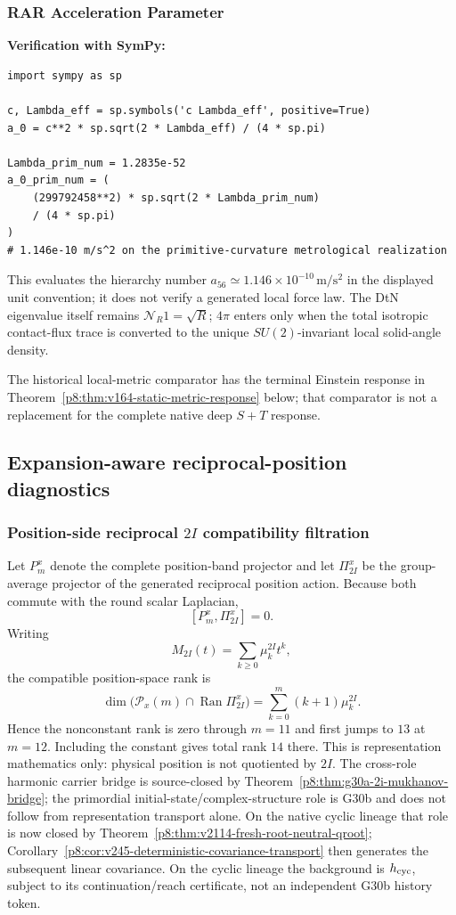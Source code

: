 \documentclass[12pt,a4paper]{article}
\begin{document}
\subsubsection{RAR Acceleration Parameter}
\textbf{Verification with SymPy:}
\begin{verbatim}
import sympy as sp

c, Lambda_eff = sp.symbols('c Lambda_eff', positive=True)
a_0 = c**2 * sp.sqrt(2 * Lambda_eff) / (4 * sp.pi)

Lambda_prim_num = 1.2835e-52
a_0_prim_num = (
    (299792458**2) * sp.sqrt(2 * Lambda_prim_num)
    / (4 * sp.pi)
)
# 1.146e-10 m/s^2 on the primitive-curvature metrological realization
\end{verbatim}
This evaluates the hierarchy number
$a_{56}\simeq1.146\times10^{-10}\,\mathrm{m/s^2}$ in the displayed unit
convention; it does not verify a generated local force law.
The DtN eigenvalue itself remains $\mathcal N_R1=\sqrt R$;
$4\pi$ enters only when the total isotropic contact-flux trace is converted to
the unique $SU(2)$-invariant local solid-angle density.

The historical local-metric comparator has the terminal Einstein response
in Theorem~\ref{p8:thm:v164-static-metric-response} below; that comparator
is not a replacement for the complete native deep $S+T$ response.

\subsection{Expansion-aware reciprocal-position diagnostics}
\label{p8:app:v191-expansion-reciprocal-diagnostics}

\subsubsection{Position-side reciprocal $2I$ compatibility filtration}
Let $P_m^x$ denote the complete position-band projector and let
$\Pi_{2I}^x$ be the group-average projector of the generated reciprocal
position action.  Because both commute with the round scalar Laplacian,
\[
 [P_m^x,\Pi_{2I}^x]=0.
\]
Writing
\[
 M_{2I}(t)=\sum_{k\ge0}\mu_k^{2I}t^k,
\]
the compatible position-space rank is
\[
 \dim\bigl(\mathcal P_x(m)\cap\operatorname{Ran}\Pi_{2I}^x\bigr)
 =\sum_{k=0}^m(k+1)\mu_k^{2I}.
\]
Hence the nonconstant rank is zero through $m=11$ and first jumps to $13$ at
$m=12$.  Including the constant gives total rank $14$ there.  This is
representation mathematics only: physical position is not quotiented by
$2I$.  The cross-role harmonic carrier bridge is source-closed by
Theorem~\ref{p8:thm:g30a-2i-mukhanov-bridge}; the primordial initial-state/complex-structure role is G30b and does not follow from representation transport alone.  On the native cyclic lineage that role is now closed by Theorem~\ref{p8:thm:v2114-fresh-root-neutral-qroot}; Corollary~\ref{p8:cor:v245-deterministic-covariance-transport} then generates the subsequent linear covariance.  On the cyclic lineage the
background is \(h_{\rm cyc}\), subject to its continuation/reach certificate,
not an independent G30b history token.
\end{document}
